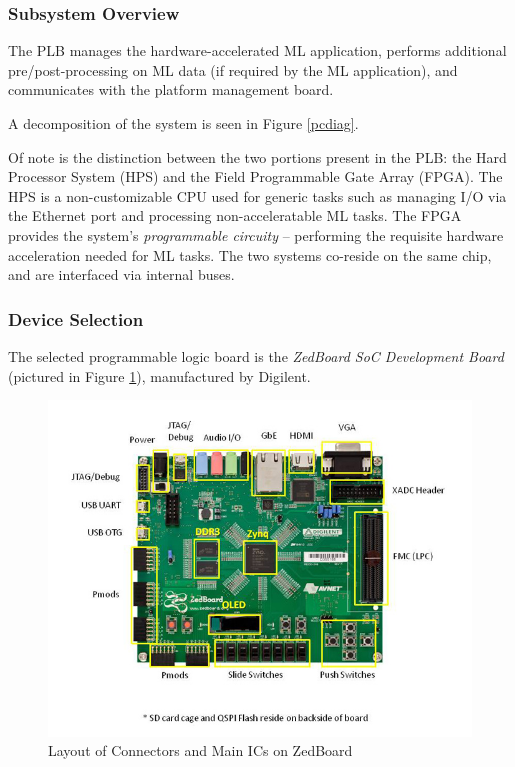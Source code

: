 \label{plb_sec}
\subsubsection{Subsystem Overview}
The PLB manages the hardware-accelerated ML application, performs additional pre/post-processing on ML data (if required by the ML application), and communicates with the platform management board.

A decomposition of the system is seen in Figure \ref{pcdiag}.

Of note is the distinction between the two portions present in the PLB: the Hard Processor System (HPS) and the Field Programmable Gate Array (FPGA). The HPS is a non-customizable CPU used for generic tasks such as managing I/O via the Ethernet port and processing non-acceleratable ML tasks. The FPGA provides the system's \textit{programmable circuity} -- performing the requisite hardware acceleration needed for ML tasks. The two systems co-reside on the same chip, and are interfaced via internal buses.

\subsubsection{Device Selection}
The selected programmable logic board is the \textit{ZedBoard SoC Development Board} (pictured in Figure \ref{zedboard}), manufactured by Digilent. 

\begin{figure}
\centering
\includegraphics[width=12.5cm]{img/zedboard_functional_overview.jpg}
\caption[Layout of Connectors and Main ICs on ZedBoard]{Layout of Connectors and Main ICs on ZedBoard \cite{zedboard}}
\label{zedboard}
\end{figure}

